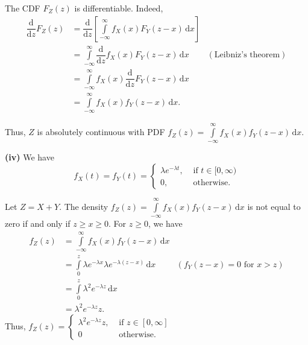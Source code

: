 The CDF $F_Z(z)$ is differentiable. Indeed,
\begin{align*}
    \dfrac{\mathrm{d}}{\mathrm{d}z} F_Z(z) 
    &= \dfrac{\mathrm{d}}{\mathrm{d}z}\left[\int\limits_{-\infty}^{\infty} f_X(x) F_Y(z-x) \,\mathrm{d}x\right]\\
    &= \int\limits_{-\infty}^{\infty} \dfrac{\mathrm{d}}{\mathrm{d}z} f_X(x) F_Y(z-x) \,\mathrm{d}x & (\text{Leibniz's theorem})\\
    &= \int\limits_{-\infty}^{\infty}  f_X(x) \dfrac{\mathrm{d}}{\mathrm{d}z} F_Y(z-x) \,\mathrm{d}x\\
    &= \int\limits_{-\infty}^{\infty}  f_X(x) f_Y(z-x) \,\mathrm{d}x.
\end{align*}

Thus, $Z$ is absolutely continuous with PDF $f_Z(z)=\int\limits_{-\infty}^{\infty}  f_X(x) f_Y(z-x) \,\mathrm{d}x$.

\textbf{(iv)} We have $$f_X(t) = f_Y(t) = \begin{cases}
    \lambda e^{-\lambda t}, &\text{ if } t\in[0,\infty)\\
    0,&\text{ otherwise.}
\end{cases}$$ 

Let $Z=X+Y$. The density $f_Z(z) =\int\limits_{-\infty}^{\infty}  f_X(x) f_Y(z-x) \,\mathrm{d}x$ is not equal to zero if and only if $z\ge x\ge 0$. For $z\ge0$, we have
\begin{align*}
    f_Z(z)
    &=\int\limits_{-\infty}^{\infty}  f_X(x) f_Y(z-x) \,\mathrm{d}x\\
    &=\int\limits_{0}^{z} \lambda e^{-\lambda x} \lambda e^{-\lambda (z-x)} \,\mathrm{d}x & (\text{$f_Y(z-x) = 0$ for $x > z$})\\
    &= \int\limits_{0}^{z} \lambda^2 e^{-\lambda z} \,\mathrm{d}x\\
    &= \lambda^2e^{-\lambda z}z.
\end{align*}
Thus, $f_Z(z)=\begin{cases}
    \lambda^2e^{-\lambda z}z, &\text{ if } z\in[0,\infty]\\
    0 & \text{ otherwise.}
\end{cases}$

